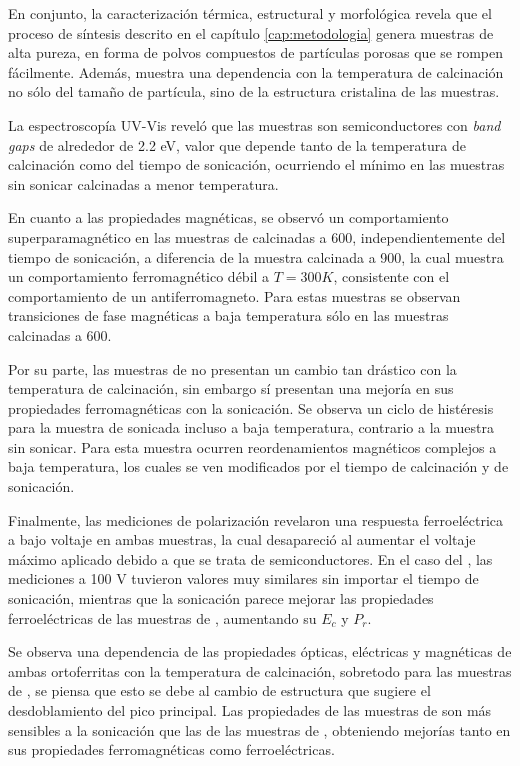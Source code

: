 \documentclass[../main.tex]{subfiles}
\begin{document}
En conjunto, la caracterización térmica, estructural y morfológica revela que el proceso de síntesis descrito en el capítulo \ref{cap:metodologia} genera muestras de alta pureza, en forma de polvos compuestos de partículas porosas que se rompen fácilmente. Además, muestra una dependencia con la temperatura de calcinación no sólo del tamaño de partícula, sino de la estructura cristalina de las muestras.

La espectroscopía UV-Vis reveló que las muestras son semiconductores con \textit{band gaps} de alrededor de 2.2 eV, valor que depende tanto de la temperatura de calcinación como del tiempo de sonicación, ocurriendo el mínimo en las muestras sin sonicar calcinadas a menor temperatura.

En cuanto a las propiedades magnéticas, se observó un comportamiento superparamagnético en las muestras de \neod{} calcinadas a 600\gradoC{}, independientemente del tiempo de sonicación, a diferencia de la muestra calcinada a 900\gradoC{}, la cual muestra un comportamiento ferromagnético débil a $T=300 K$, consistente con el comportamiento de un antiferromagneto. Para estas muestras se observan transiciones de fase magnéticas a baja temperatura sólo en las muestras calcinadas a 600\gradoC{}.

Por su parte, las muestras de \sama{} no presentan un cambio tan drástico con la temperatura de calcinación, sin embargo sí presentan una mejoría en sus propiedades ferromagnéticas con la sonicación. Se observa un ciclo de histéresis para la muestra de \sama{} sonicada incluso a baja temperatura, contrario a la muestra sin sonicar. Para esta muestra ocurren reordenamientos magnéticos complejos a baja temperatura, los cuales se ven modificados por el tiempo de calcinación y de sonicación.

Finalmente, las mediciones de polarización revelaron una respuesta ferroeléctrica a bajo voltaje en ambas muestras, la cual desapareció al aumentar el voltaje máximo aplicado debido a que se trata de semiconductores. En el caso del \neod{}, las mediciones a 100 V tuvieron valores muy similares sin importar el tiempo de sonicación, mientras que la sonicación parece mejorar las propiedades ferroeléctricas de las muestras de \sama{}, aumentando su $E_c$ y $P_r$.

Se observa una dependencia de las propiedades ópticas, eléctricas y magnéticas de ambas ortoferritas con la temperatura de calcinación, sobretodo para las muestras de \neod{}, se piensa que esto se debe al cambio de estructura que sugiere el desdoblamiento del pico principal. Las propiedades de las muestras de \sama{} son más sensibles a la sonicación que las de las muestras de \neod{}, obteniendo mejorías tanto en sus propiedades ferromagnéticas como ferroeléctricas.
\end{document}
